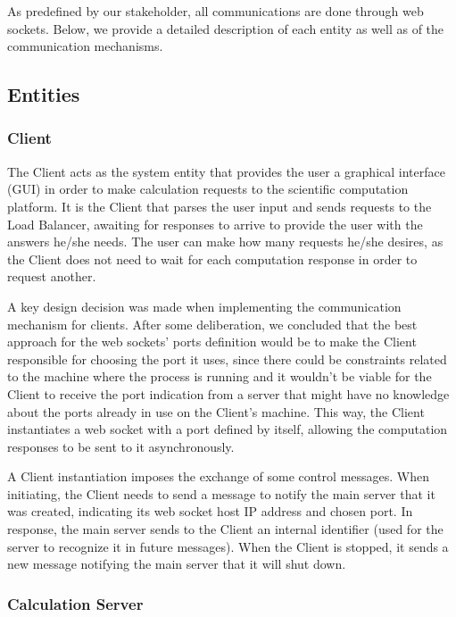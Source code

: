 \documentclass[12pt]{article}
\begin{document}
As predefined by our stakeholder, all communications are done through web sockets.
Below, we provide a detailed description of each entity as well as of the communication mechanisms.

\subsection{Entities} \label{entities} %

\subsubsection{Client}

The Client acts as the system entity that provides the user a graphical interface (GUI) in order to make calculation requests to the scientific computation 
platform.
It is the Client that parses the user input and sends requests to the Load Balancer, awaiting for responses to arrive to provide the user with the answers he/she needs.
The user can make how many requests he/she desires, as the Client does not need to wait for each computation response in order to request another.

A key design decision was made when implementing the communication mechanism for clients.
After some deliberation, we concluded that the best approach for the web sockets' ports definition would be to make the Client responsible for choosing the port
it uses, since there could be constraints related to the machine where the process is running and it wouldn't be viable for the Client to receive the port 
indication from a server that might have no knowledge about the ports already in use on the Client's machine. 
This way, the Client instantiates a web socket with a port defined by itself, allowing the computation responses to be sent to it asynchronously.

A Client instantiation imposes the exchange of some control messages.
When initiating, the Client needs to send a message to notify the main server that it was created, indicating its web socket host IP address and chosen port.
In response, the main server sends to the Client an internal identifier (used for the server to recognize it in future messages).
When the Client is stopped, it sends a new message notifying the main server that it will shut down. 

\subsubsection{Calculation Server}
\end{document}
